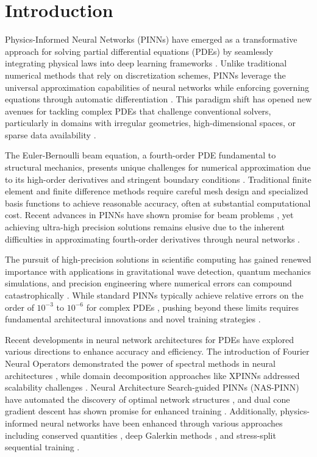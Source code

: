 \section{Introduction}\label{sec:intro}

Physics-Informed Neural Networks (PINNs) have emerged as a transformative approach for solving partial differential equations (PDEs) by seamlessly integrating physical laws into deep learning frameworks \cite{raissi2019physics,raissi2017physics2}. Unlike traditional numerical methods that rely on discretization schemes, PINNs leverage the universal approximation capabilities of neural networks while enforcing governing equations through automatic differentiation \cite{karniadakis2021physics,cuomo2022scientific}. This paradigm shift has opened new avenues for tackling complex PDEs that challenge conventional solvers, particularly in domains with irregular geometries, high-dimensional spaces, or sparse data availability \cite{chen2021physics,pang2020fPINNs}.

The Euler-Bernoulli beam equation, a fourth-order PDE fundamental to structural mechanics, presents unique challenges for numerical approximation due to its high-order derivatives and stringent boundary conditions \cite{kapoor2023physics,luo2023cable}. Traditional finite element and finite difference methods require careful mesh design and specialized basis functions to achieve reasonable accuracy, often at substantial computational cost. Recent advances in PINNs have shown promise for beam problems \cite{kapoor2024transfer,kapoor2023physics}, yet achieving ultra-high precision solutions remains elusive due to the inherent difficulties in approximating fourth-order derivatives through neural networks \cite{vahab2022physics}.

The pursuit of high-precision solutions in scientific computing has gained renewed importance with applications in gravitational wave detection, quantum mechanics simulations, and precision engineering where numerical errors can compound catastrophically \cite{mukhametzhanov2022high,wong2022learning}. While standard PINNs typically achieve relative errors on the order of $10^{-3}$ to $10^{-6}$ for complex PDEs \cite{jagtap2020conservative,lu2021deepxde}, pushing beyond these limits requires fundamental architectural innovations and novel training strategies \cite{brunton2024machine,zhao2024comprehensive}.

Recent developments in neural network architectures for PDEs have explored various directions to enhance accuracy and efficiency. The introduction of Fourier Neural Operators demonstrated the power of spectral methods in neural architectures \cite{li2021fourier}, while domain decomposition approaches like XPINNs addressed scalability challenges \cite{jagtap2020extended,kharazmi2021hp}. Neural Architecture Search-guided PINNs (NAS-PINN) have automated the discovery of optimal network structures \cite{wang2024nas}, and dual cone gradient descent has shown promise for enhanced training \cite{hwang2024dual}. Additionally, physics-informed neural networks have been enhanced through various approaches including conserved quantities \cite{lin2022two}, deep Galerkin methods \cite{sirignano2018dgm}, and stress-split sequential training \cite{haghighat2022physics}.

